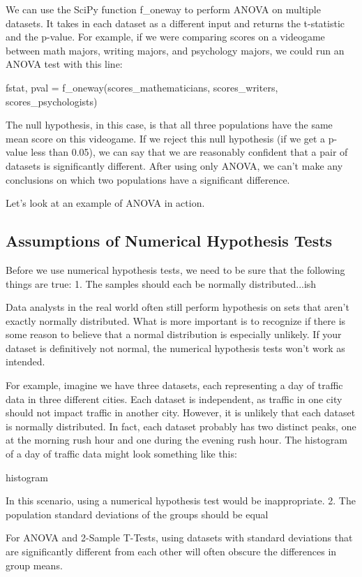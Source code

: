\documentclass{journal}
\begin{document}
We can use the SciPy function f_oneway to perform ANOVA on multiple datasets. It takes in each dataset as a different input and returns the t-statistic and the p-value. For example, if we were comparing scores on a videogame between math majors, writing majors, and psychology majors, we could run an ANOVA test with this line:

fstat, pval = f_oneway(scores_mathematicians, scores_writers, scores_psychologists)

The null hypothesis, in this case, is that all three populations have the same mean score on this videogame. If we reject this null hypothesis (if we get a p-value less than 0.05), we can say that we are reasonably confident that a pair of datasets is significantly different. After using only ANOVA, we can't make any conclusions on which two populations have a significant difference.

Let's look at an example of ANOVA in action.

\subsection{Assumptions of Numerical Hypothesis Tests}
Before we use numerical hypothesis tests, we need to be sure that the following things are true:
1. The samples should each be normally distributed...ish

Data analysts in the real world often still perform hypothesis on sets that aren't exactly normally distributed. What is more important is to recognize if there is some reason to believe that a normal distribution is especially unlikely. If your dataset is definitively not normal, the numerical hypothesis tests won't work as intended.

For example, imagine we have three datasets, each representing a day of traffic data in three different cities. Each dataset is independent, as traffic in one city should not impact traffic in another city. However, it is unlikely that each dataset is normally distributed. In fact, each dataset probably has two distinct peaks, one at the morning rush hour and one during the evening rush hour. The histogram of a day of traffic data might look something like this:

histogram

In this scenario, using a numerical hypothesis test would be inappropriate.
2. The population standard deviations of the groups should be equal

For ANOVA and 2-Sample T-Tests, using datasets with standard deviations that are significantly different from each other will often obscure the differences in group means.
\end{document}
